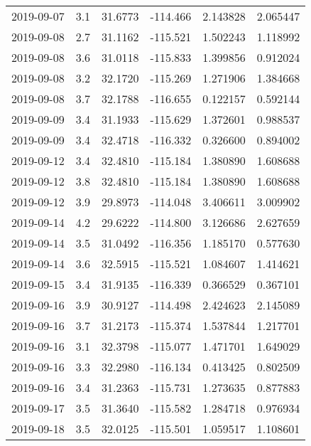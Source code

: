 \begin{tabular}{lrrrrr}
2019-09-07 &       3.1 &  31.6773 &  -114.466 &         2.143828 &         2.065447 \\
2019-09-08 &       2.7 &  31.1162 &  -115.521 &         1.502243 &         1.118992 \\
2019-09-08 &       3.6 &  31.0118 &  -115.833 &         1.399856 &         0.912024 \\
2019-09-08 &       3.2 &  32.1720 &  -115.269 &         1.271906 &         1.384668 \\
2019-09-08 &       3.7 &  32.1788 &  -116.655 &         0.122157 &         0.592144 \\
2019-09-09 &       3.4 &  31.1933 &  -115.629 &         1.372601 &         0.988537 \\
2019-09-09 &       3.4 &  32.4718 &  -116.332 &         0.326600 &         0.894002 \\
2019-09-12 &       3.4 &  32.4810 &  -115.184 &         1.380890 &         1.608688 \\
2019-09-12 &       3.8 &  32.4810 &  -115.184 &         1.380890 &         1.608688 \\
2019-09-12 &       3.9 &  29.8973 &  -114.048 &         3.406611 &         3.009902 \\
2019-09-14 &       4.2 &  29.6222 &  -114.800 &         3.126686 &         2.627659 \\
2019-09-14 &       3.5 &  31.0492 &  -116.356 &         1.185170 &         0.577630 \\
2019-09-14 &       3.6 &  32.5915 &  -115.521 &         1.084607 &         1.414621 \\
2019-09-15 &       3.4 &  31.9135 &  -116.339 &         0.366529 &         0.367101 \\
2019-09-16 &       3.9 &  30.9127 &  -114.498 &         2.424623 &         2.145089 \\
2019-09-16 &       3.7 &  31.2173 &  -115.374 &         1.537844 &         1.217701 \\
2019-09-16 &       3.1 &  32.3798 &  -115.077 &         1.471701 &         1.649029 \\
2019-09-16 &       3.3 &  32.2980 &  -116.134 &         0.413425 &         0.802509 \\
2019-09-16 &       3.4 &  31.2363 &  -115.731 &         1.273635 &         0.877883 \\
2019-09-17 &       3.5 &  31.3640 &  -115.582 &         1.284718 &         0.976934 \\
2019-09-18 &       3.5 &  32.0125 &  -115.501 &         1.059517 &         1.108601 \\

\end{tabular}
